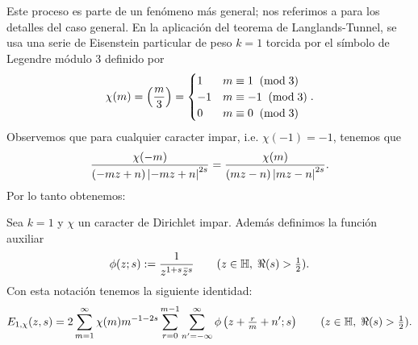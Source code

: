 Este proceso es parte de un fen\'omeno m\'as general; nos referimos a \cite[\S7.2]{MiyakeMF} para
los detalles del caso general. En la aplicaci\'on del teorema de Langlands-Tunnel, se usa una serie
de Eisenstein particular de peso $k=1$ torcida por el s\'imbolo de Legendre m\'odulo 3 definido
por
\[
  \chi(m)=\left(\frac{m}{3}\right)=
  \begin{cases}
    1 & m\equiv 1 \;\;(\mathrm{mod}\; 3)\\
    -1 & m\equiv -1 \;\;(\mathrm{mod}\; 3)\\
    0 & m\equiv 0 \;\;(\mathrm{mod}\; 3)
  \end{cases}.
\]
Observemos que para cualquier caracter impar, i.e. $\chi(-1)=-1$, tenemos que
\begin{equation}\label{eq:chiimpar}
  \frac{\chi(-m)}{(-mz+n)\left| -mz+n \right|^{2s}}=\frac{\chi(m)}{(mz-n)\left| mz-n \right|^{2s}}.
\end{equation}
Por lo tanto obtenemos:

\begin{prop}
  Sea $k=1$ y $\chi$ un caracter de Dirichlet impar. Adem\'as definimos la funci\'on auxiliar
  \[
    \phi(z;s):=\frac{1}{z^{1+s}\bar{z}^s}\qquad(z\in\mathbb{H},\;\Re(s)>\tfrac{1}{2}).
  \]
  Con esta notaci\'on tenemos la siguiente identidad:
\begin{equation}\label{eq:E1chi}
  E_{1,\chi}(z,s)=
  2\sum_{m=1}^{\infty}\chi(m)m^{-1-2s}\sum_{r=0}^{m-1}
  \sum_{n'=-\infty}^{\infty}\phi\left( z+\tfrac{r}{m}+n';s \right)\qquad(z\in\mathbb{H},\;\Re(s)>\tfrac{1}{2}).
\end{equation}
\end{prop}

